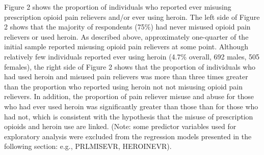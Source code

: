 \documentclass[sigconf]{acmart}
\begin{document}
Figure 2 shows the proportion of individuals who reported ever misusing 
prescription opioid pain relievers and/or ever using heroin. The left side 
of Figure 2 shows that the majority of respondents (75\%) had never misused 
opioid pain relievers or used heroin. As described above, approximately 
one-quarter of the initial sample reported misusing opioid pain relievers at 
some point. Although relatively few individuals reported ever using heroin 
(4.7\% overall, 692 males, 505 females), the right side of Figure 2 shows 
that the proportion of individuals who had used heroin and misused pain 
relievers was more than three times greater than the proportion who reported
using heroin not not misusing opioid pain relievers. In addition, the 
proportion of pain reliever misuse and abuse for those who had ever used 
heroin was significantly greater than those than for those who had not, 
which is consistent with the hypothesis that the misuse of prescription 
opioids and heroin use are linked. (Note: some predictor variables used for
exploratory analysis were excluded from the regression models presented in 
the following section: e.g., PRLMISEVR, HEROINEVR). 

\end{document}
